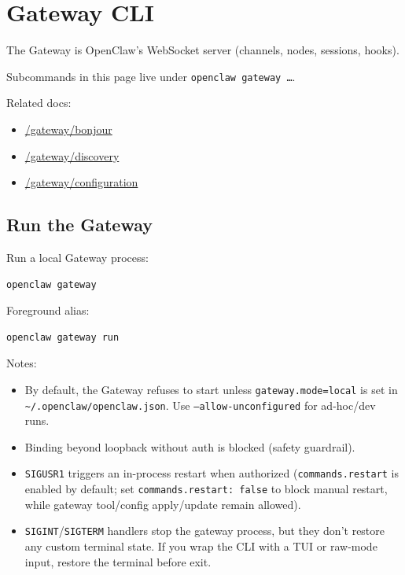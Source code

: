 \clearpage

\section{Gateway CLI}


The Gateway is OpenClaw’s WebSocket server (channels, nodes, sessions, hooks).

Subcommands in this page live under \texttt{openclaw gateway …}.

Related docs:

\begin{itemize}
  \item \href{/gateway/bonjour}{/gateway/bonjour}
  \item \href{/gateway/discovery}{/gateway/discovery}
  \item \href{/gateway/configuration}{/gateway/configuration}
\end{itemize}


\subsection{Run the Gateway}


Run a local Gateway process:

\begin{lstlisting}[language=bash]
openclaw gateway
\end{lstlisting}


Foreground alias:

\begin{lstlisting}[language=bash]
openclaw gateway run
\end{lstlisting}


Notes:

\begin{itemize}
  \item By default, the Gateway refuses to start unless \texttt{gateway.mode=local} is set in \texttt{\textasciitilde{}/.openclaw/openclaw.json}. Use \texttt{--allow-unconfigured} for ad-hoc/dev runs.
  \item Binding beyond loopback without auth is blocked (safety guardrail).
  \item \texttt{SIGUSR1} triggers an in-process restart when authorized (\texttt{commands.restart} is enabled by default; set \texttt{commands.restart: false} to block manual restart, while gateway tool/config apply/update remain allowed).
  \item \texttt{SIGINT}/\texttt{SIGTERM} handlers stop the gateway process, but they don’t restore any custom terminal state. If you wrap the CLI with a TUI or raw-mode input, restore the terminal before exit.
\end{itemize}



